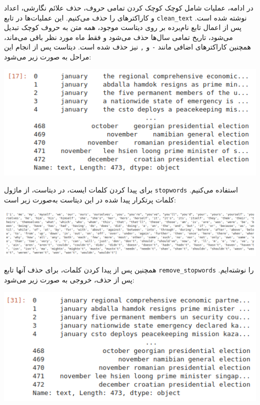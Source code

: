 \begin{enumerate}
\begin{qsolve}
	در ادامه، عملیات  شامل کوچک کوچک کردن تمامی حروف، حذف علائم نگارشی، اعداد و کاراکترهای  را حذف می‌کنیم. این عملیات‌ها در تابع \texttt{clean\_text} نوشته شده است. پس از اعمال تابع نام‌برده بر روی دیتاست موجود، همه متن به حروف کوچک تبدیل می‌شود، تاریخ تمامی سال‌ها حذف می‌شود و فقط ماه‌ مورد نظر باقی می‌ماند، همچنین کاراکتر‌های اضافی مانند \texttt{-} و \texttt{,} نیز حذف شده است. دیتاست پس از انجام این مراحل به صورت زیر می‌شود:
	
	\begin{center}
		\includegraphics*[width=0.7\linewidth]{pics/img10.png}
		\label{دیتاست ورودی پس از حذف علائم نگارشی و کوچک سازی کلمات}
	\end{center}
	
	
	\end{qsolve}
	
	
	
	
	
	
	
	\begin{qsolve}
		برای پیدا کردن کلمات ایست، در دیتاست، از ماژول \texttt{stopwords} استفاده می‌کنیم. کلمات پرتکرار پیدا شده در این دیتاست به‌صورت زیر است:
		
		
		\begin{center}
			\includegraphics*[width=1\linewidth]{pics/img11.png}
			\label{کلمات ایست}
		\end{center}
		
		
		
		
		همچنین پس از پیدا کردن کلمات، برای حذف آنها تابع \texttt{remove\_stopwords} را نوشته‌ایم. پس از حذف، خروجی به صورت زیر می‌شود:
		
		\begin{center}
			\includegraphics*[width=0.8\linewidth]{pics/img12.png}
			\label{خروجی پس از حذف کلمات ایست}
		\end{center}
		

\end{qsolve}
\end{enumerate}
